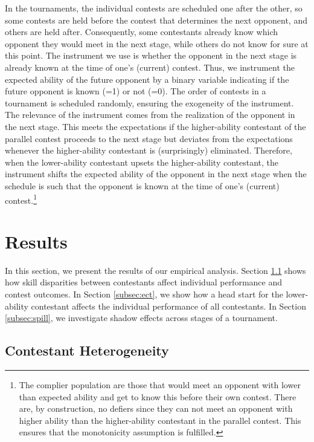 \documentclass[11pt,a4paper]{article}
\let\Oldsection\section
\renewcommand{\section}{\FloatBarrier\Oldsection}
\begin{document}
In the tournaments, the individual contests are scheduled one after the other, so some contests are held before the contest that determines the next opponent, and others are held after. Consequently, some contestants already know which opponent they would meet in the next stage, while others do not know for sure at this point. The instrument we use is whether the opponent in the next stage is already known at the time of one's (current) contest. Thus, we instrument the expected ability of the future opponent by a binary variable indicating if the future opponent is known (=1) or not (=0). The order of contests in a tournament is scheduled randomly, ensuring the exogeneity of the instrument.
The relevance of the instrument comes from the realization of the opponent in the next stage. This meets the expectations if the higher-ability contestant of the parallel contest proceeds to the next stage but deviates from the expectations whenever the higher-ability contestant is (surprisingly) eliminated. Therefore, when the lower-ability contestant upsets the higher-ability contestant, the instrument shifts the expected ability of the opponent in the next stage when the schedule is such that the opponent is known at the time of one's (current) contest.\footnote{The complier population are those that would meet an opponent with lower than expected ability and get to know this before their own contest. There are, by construction, no defiers since they can not meet an opponent with higher ability than the higher-ability contestant in the parallel contest. This ensures that the monotonicity assumption is fulfilled.} \par

\section{Results}\label{sec:results}

In this section, we present the results of our empirical analysis. Section \ref{subsec:cont_het} shows how skill disparities between contestants affect individual performance and contest outcomes. In Section \ref{subsec:ect}, we show how a head start for the lower-ability contestant affects the individual performance of all contestants. In Section \ref{subsec:spill}, we investigate shadow effects across stages of a tournament.  \par

\subsection{Contestant Heterogeneity}\label{subsec:cont_het}
\end{document}
